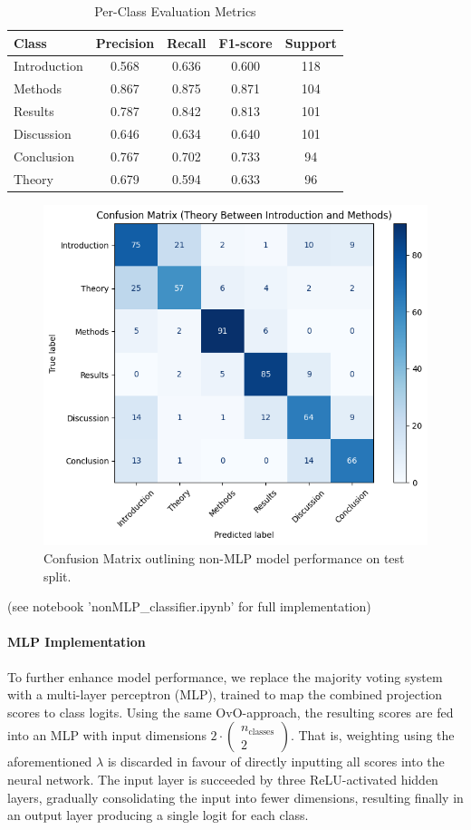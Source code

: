 \begin{table}%
\centering
\caption{Per-Class Evaluation Metrics}
\begin{tabular}{lcccc}
\toprule
\textbf{Class} & \textbf{Precision} & \textbf{Recall} & \textbf{F1-score} & \textbf{Support} \\
\midrule
Introduction      & 0.568 & 0.636 & 0.600 & 118 \\
Methods           & 0.867 & 0.875 & 0.871 & 104 \\
Results           & 0.787 & 0.842 & 0.813 & 101 \\
Discussion        & 0.646 & 0.634 & 0.640 & 101 \\
Conclusion        & 0.767 & 0.702 & 0.733 & 94  \\
Theory            & 0.679 & 0.594 & 0.633 & 96  \\
\bottomrule
\end{tabular}
\label{tab:107}
\end{table}

\begin{figure}%
    \centering
    \includegraphics[width=0.6\linewidth]{media/nonML_confusion_matrix.png}
    \caption{Confusion Matrix outlining non-MLP model performance on test split.}
    \label{fig:104}
\end{figure}
\noindent (see notebook 'nonMLP\_classifier.ipynb' for full implementation)
\paragraph{MLP Implementation}
To further enhance model performance, we replace the majority voting system with a multi-layer perceptron (MLP), trained to map the combined projection scores to class logits. Using the same OvO-approach, the resulting scores are fed into an MLP with input dimensions $2\cdot \begin{pmatrix}
    n_{\text{classes}}\\
    2
\end{pmatrix}$. That is, weighting using the aforementioned $\lambda$ is discarded in favour of directly inputting all scores into the neural network. The input layer is succeeded by three ReLU-activated hidden layers, gradually consolidating the input into fewer dimensions, resulting finally in an output layer producing a single logit for each class.

